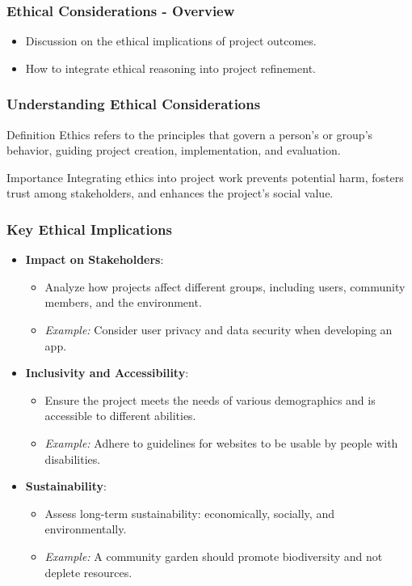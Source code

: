 \documentclass[aspectratio=169]{beamer}
\begin{document}
\begin{frame}[fragile]
    \frametitle{Ethical Considerations - Overview}
    \begin{itemize}
        \item Discussion on the ethical implications of project outcomes.
        \item How to integrate ethical reasoning into project refinement.
    \end{itemize}
\end{frame}

\begin{frame}[fragile]
    \frametitle{Understanding Ethical Considerations}
    \begin{block}{Definition}
        Ethics refers to the principles that govern a person's or group's behavior, guiding project creation, implementation, and evaluation.
    \end{block}

    \begin{block}{Importance}
        Integrating ethics into project work prevents potential harm, fosters trust among stakeholders, and enhances the project's social value.
    \end{block}
\end{frame}

\begin{frame}[fragile]
    \frametitle{Key Ethical Implications}
    \begin{itemize}
        \item \textbf{Impact on Stakeholders}: 
        \begin{itemize}
            \item Analyze how projects affect different groups, including users, community members, and the environment. 
            \item \textit{Example:} Consider user privacy and data security when developing an app.
        \end{itemize}
        
        \item \textbf{Inclusivity and Accessibility}: 
        \begin{itemize}
            \item Ensure the project meets the needs of various demographics and is accessible to different abilities.
            \item \textit{Example:} Adhere to guidelines for websites to be usable by people with disabilities.
        \end{itemize}

        \item \textbf{Sustainability}: 
        \begin{itemize}
            \item Assess long-term sustainability: economically, socially, and environmentally.
            \item \textit{Example:} A community garden should promote biodiversity and not deplete resources.
        \end{itemize}
    \end{itemize}
\end{frame}
\end{document}
